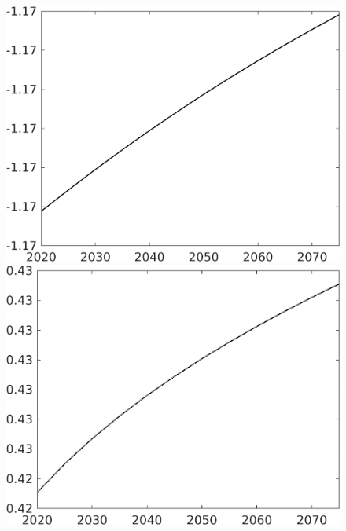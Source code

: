 \documentclass[12pt]{article}
\begin{document}
\begin{figure}[h!!]
\begin{minipage}[]{0.32\textwidth}
	\end{minipage}	
	\begin{minipage}[]{0.32\textwidth}
		\includegraphics[width=1\textwidth]{../../codding_model/own_basedOnFried/optimalPol_010922_revision/figures/all_13Sept22/CompTaul_LFBAUPer_Reg0_LgLf_spillover0_nsk0_xgr1_knspil0_sep1_countec0_GovRev0_etaa0.79.png}
	\end{minipage}	
	\begin{minipage}[]{0.32\textwidth}
		\includegraphics[width=1\textwidth]{../../codding_model/own_basedOnFried/optimalPol_010922_revision/figures/all_13Sept22/CompTaul_LFBAU_Reg0_EY_spillover0_nsk0_xgr1_knspil0_sep1_countec0_GovRev0_etaa0.79_lgd0.png}

\end{minipage}
\end{figure}
\end{document}
